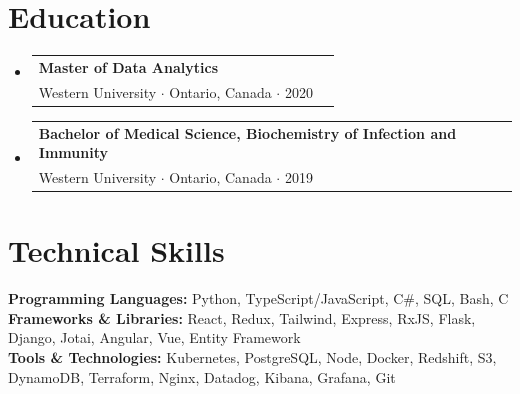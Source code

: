 \documentclass[letterpaper,10pt]{article}
\makeatletter
\newcommand{\resumeEducationHeading}[4]{
  \vspace{-2pt}\item
    \begin{tabular*}{0.97\textwidth}[t]{l@{\extracolsep{\fill}}r}
      \textbf{#1}\\
      \quad \small#3 $\cdot$ \small #4 $\cdot$ #2\\
    \end{tabular*}\vspace{-5pt}
}
\newcommand{\resumeOrganizationHeading}[4]{
  \vspace{-2pt}\item
    \begin{tabular*}{0.97\textwidth}[t]{l@{\extracolsep{\fill}}r}
      \textbf{#1} & \textit{\small #2} \\
      \textit{\small#3}
    \end{tabular*}\vspace{-7pt}
}
\newcommand{\resumeSubHeadingListStart}{\begin{itemize}[leftmargin=0.15in, label={}]}
\newcommand{\resumeSubHeadingListEnd}{\end{itemize}}
\makeatother
\begin{document}

\vspace*{1pt}
\section{Education}
  \vspace{3pt}
  \resumeSubHeadingListStart
    
    \resumeEducationHeading
      {Master of Data Analytics}{2020}
      {Western University}{Ontario, Canada}

    \resumeEducationHeading
      {Bachelor of Medical Science, Biochemistry of Infection and Immunity}{2019}
      {Western University}{Ontario, Canada}

    \resumeSubHeadingListEnd


\vspace*{1pt}
\section{Technical Skills}
  \vspace{3pt}
  \resumeSubHeadingListStart
    \small{\item{
        \textbf{Programming Languages:}{ Python, TypeScript/JavaScript, C\#, SQL, Bash, C } \\ \vspace{3pt}
        \textbf{Frameworks \& Libraries:}{ React, Redux, Tailwind, Express, RxJS, Flask, Django, Jotai, Angular, Vue, Entity Framework } \\ \vspace{3pt}
        \textbf{Tools \& Technologies:}{ Kubernetes, PostgreSQL, Node, Docker, Redshift, S3, DynamoDB, Terraform, Nginx, Datadog, Kibana, Grafana, Git } \\
    }}
  \resumeSubHeadingListEnd



    
    

\end{document}
